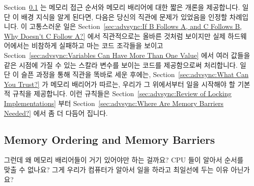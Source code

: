 Section~\ref{sec:advsync:Memory Ordering and Memory Barriers} 는 메모리 접근
순서와 메모리 배리어에 대한 짧은 개론을 제공합니다.
일단 이 배경 지식을 알게 된다면, 다음은 당신의 직관에 문제가 있었음을 인정할
차례입니다.
이 고통스러운 일은
Section~\ref{sec:advsync:If B Follows A, and C Follows B, Why Doesn't C Follow A?}
에서 직관적으로는 올바른 것처럼 보이지만 실제 하드웨어에서는 비참하게 실패하고
마는 코드 조각들을 보이고
Section~\ref{sec:advsync:Variables Can Have More Than One Value} 에서 여러
값들을 같은 시점에 가질 수 있는 스칼라 변수를 보이는 코드를 제공함으로써
처리합니다.
일단 이 슬픈 과정을 통해 직관을 똑바로 세운 후에는,
Section~\ref{sec:advsync:What Can You Trust?} 가 메모리 배리어가 따르는, 우리가
그 위에서부터 일을 시작해야 할 기본적 규칙을 제공합니다.
이런 규칙들은
Section~\ref{sec:advsync:Review of Locking Implementations}
부터 Section~\ref{sec:advsync:Where Are Memory Barriers Needed?} 에서 좀 더
다듬어 집니다.

\subsection{Memory Ordering and Memory Barriers}
\label{sec:advsync:Memory Ordering and Memory Barriers}

그런데 왜 메모리 배리어들이 거기 있어야만 하는 걸까요?
CPU 들이 알아서 순서를 맞출 수 없나요?
그게 우리가 컴퓨터가 알아서 일을 하라고 최일선에 두는 이유 아닌가요?

